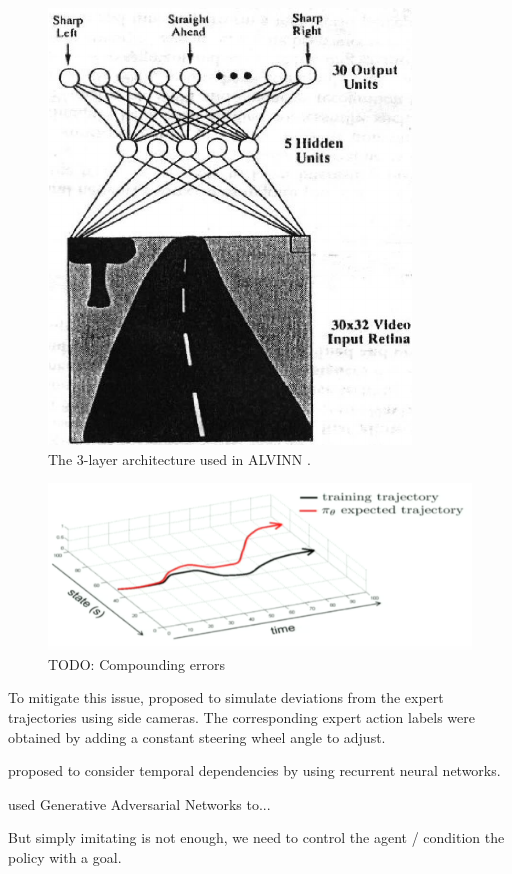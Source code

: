 \begin{figure}[tp]
	\centering
	\includegraphics[width=0.4\linewidth]{img/alvinn}
	\caption{The 3-layer architecture used in ALVINN \citep{Pomerleau89}.}
	\label{fig:alvinn}
\end{figure}


\begin{figure}[tp]
	\centering
	\includegraphics[width=0.7\linewidth]{img/cp4}
	\caption{TODO: Compounding errors}
\end{figure}

To mitigate this issue, \citep{Bojarski2016} proposed to simulate deviations from the expert trajectories using side cameras. The corresponding expert action labels were obtained by adding a constant steering wheel angle to adjust.

\citep{Eraqi2017,Xu2017} proposed to consider temporal dependencies by using recurrent neural networks.

\citep{Kuefler2017,Bhattacharyya2018} used Generative Adversarial Networks to...

But simply imitating is not enough, we need to control the agent / condition the policy with a goal. \citep{Codevilla2018}

